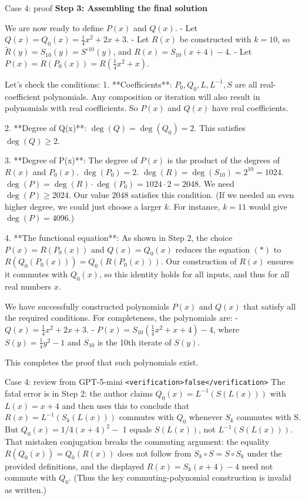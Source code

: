 \documentclass{article} %
\begin{document}
\begin{promptbox}{Case 4: proof}
\textbf{Step 3: Assembling the final solution}

We are now ready to define $P(x)$ and $Q(x)$.
- Let $Q(x) = Q_0(x) = \frac{1}{4}x^2+2x+3$.
- Let $R(x)$ be constructed with $k=10$, so $\tilde{R}(y) = S_{10}(y) = S^{\circ 10}(y)$, and $R(x) = S_{10}(x+4)-4$.
- Let $P(x) = R(P_0(x)) = R(\frac{1}{4}x^2+x)$.

Let's check the conditions:
1. **Coefficients**: $P_0, Q_0, L, L^{-1}, S$ are all real-coefficient polynomials. Any composition or iteration will also result in polynomials with real coefficients. So $P(x)$ and $Q(x)$ have real coefficients.

2. **Degree of Q(x)**: $\deg(Q) = \deg(Q_0) = 2$. This satisfies $\deg(Q) \ge 2$.

3. **Degree of P(x)**: The degree of $P(x)$ is the product of the degrees of $R(x)$ and $P_0(x)$.
 $\deg(P_0) = 2$.
 $\deg(R) = \deg(S_{10}) = 2^{10} = 1024$.
 $\deg(P) = \deg(R) \cdot \deg(P_0) = 1024 \cdot 2 = 2048$.
 We need $\deg(P) \ge 2024$. Our value $2048$ satisfies this condition.
 (If we needed an even higher degree, we could just choose a larger $k$. For instance, $k=11$ would give $\deg(P)=4096$.)

4. **The functional equation**: As shown in Step 2, the choice $P(x)=R(P_0(x))$ and $Q(x)=Q_0(x)$ reduces the equation $(*)$ to $R(Q_0(P_0(x))) = Q_0(R(P_0(x)))$. Our construction of $R(x)$ ensures it commutes with $Q_0(x)$, so this identity holds for all inputs, and thus for all real numbers $x$.

We have successfully constructed polynomials $P(x)$ and $Q(x)$ that satisfy all the required conditions.
For completeness, the polynomials are:
- $Q(x) = \frac{1}{4}x^2+2x+3$.
- $P(x) = S_{10}(\frac{1}{4}x^2+x+4)-4$, where $S(y) = \frac{1}{4}y^2-1$ and $S_{10}$ is the 10th iterate of $S(y)$.

This completes the proof that such polynomials exist.
\end{promptbox}

\begin{promptbox}{Case 4: review from GPT-5-mini}
  \verb|<verification>false</verification>|
  The fatal error is in Step 2: the author claims  $ Q_0(x) = L^{-1}(S(L(x))) $  with  $ L(x)=x+4 $  and then uses this to conclude that  $ R(x)=L^{-1}(S_k(L(x)))  $ commutes with  $ Q_0 $  whenever  $ S_k $  commutes with S. But  $ Q_0(x)=1/4(x+4)^2- $ 1 equals  $ S(L(x)) $, not  $ L^{-1}(S(L(x))) $. That mistaken conjugation breaks the commuting argument: the equality  $ R(Q_0(x)) = Q_0(R(x)) $  does not follow from  $ S_k\circ S = S\circ S_k $  under the provided definitions, and the displayed  $ R(x)=S_k(x+4)-4 $  need not commute with  $ Q_0 $. (Thus the key commuting-polynomial construction is invalid as written.)
\end{promptbox}
\end{document}
